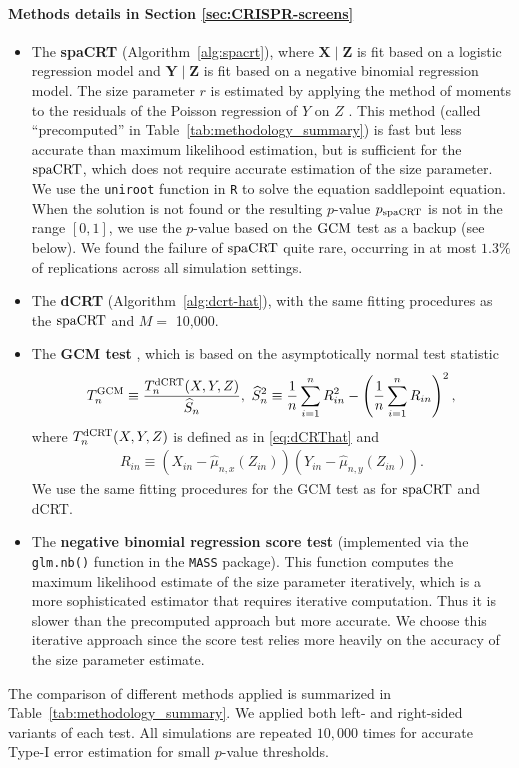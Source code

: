 \documentclass[12pt]{article}
\theoremstyle{definition}
\newcommand{\prx}{\bm X}								%
\newcommand{\srx}{X}									%
\newcommand{\prz}{\bm Z}								%
\newcommand{\srz}{Z}									%
\newcommand{\pry}{{\bm Y}}								%
\newcommand{\sry}{Y}									%
\newcommand{\dCRT}{\textnormal{dCRT}} 					%
\newcommand{\GCM}{\textnormal{GCM}}						%
\newcommand{\spacrt}{\textnormal{spaCRT}}               %
\begin{document}
\paragraph{Methods details in Section \ref{sec:CRISPR-screens}}
\begin{itemize}
  \item The \textbf{spaCRT} (Algorithm~\ref{alg:spacrt}), where $\prx \mid \prz$ is fit based on a logistic regression model and $\pry \mid \prz$ is fit based on a negative binomial regression model. The size parameter $r$ is estimated by applying the method of moments to the residuals of the Poisson regression of $Y$ on $Z$ \citep{Katsevich2020c,Barry2024}. This method (called ``precomputed'' in Table~\ref{tab:methodology_summary}) is fast but less accurate than maximum likelihood estimation, but is sufficient for the $\spacrt$, which does not require accurate estimation of the size parameter. We use the \texttt{uniroot} function in \texttt{R} to solve the equation saddlepoint equation. When the solution is not found or the resulting $p$-value $p_{\spacrt}$ is not in the range $[0,1]$, we use the $p$-value based on the $\GCM$ test as a backup (see below). We found the failure of $\spacrt$ quite rare, occurring in at most $1.3\%$ of replications across all simulation settings.
  \item The \textbf{dCRT} (Algorithm~\ref{alg:dcrt-hat}), with the same fitting procedures as the $\spacrt$ and $M =$ 10,000.
  \item The \textbf{GCM test} \citep{Shah2018}, which is based on the asymptotically normal test statistic
  \begin{align*}
    T_n^{\GCM}\equiv\frac{T_n^{\dCRT}(X,Y,Z)}{\widehat{S}_n},\ \widehat{S}_n^2\equiv \frac{1}{n}\sum_{i=1}^n R_{in}^2-\left(\frac{1}{n}\sum_{i=1}^n R_{in}\right)^2,
  \end{align*}
  where $T_n^{\dCRT}(X,Y,Z)$ is defined as in \eqref{eq:dCRThat} and
  \begin{align*}
    R_{in} \equiv (\srx_{in}-\widehat{\mu}_{n,x}(\srz_{in}))(\sry_{in}-\widehat{\mu}_{n,y}(\srz_{in})).
  \end{align*}
  We use the same fitting procedures for the GCM test as for $\spacrt$ and dCRT.
  \item The \textbf{negative binomial regression score test} (implemented via the \verb|glm.nb()| function in the \verb|MASS| package). This function computes the maximum likelihood estimate of the size parameter iteratively, which is a more sophisticated estimator that requires iterative computation. Thus it is slower than the precomputed approach but more accurate. We choose this iterative approach since the score test relies more heavily on the accuracy of the size parameter estimate.
  \end{itemize}
  The comparison of different methods applied is summarized in Table~\ref{tab:methodology_summary}. We applied both left- and right-sided variants of each test. All simulations are repeated $10,000$ times for accurate Type-I error estimation for small $p$-value thresholds. 
\end{document}
